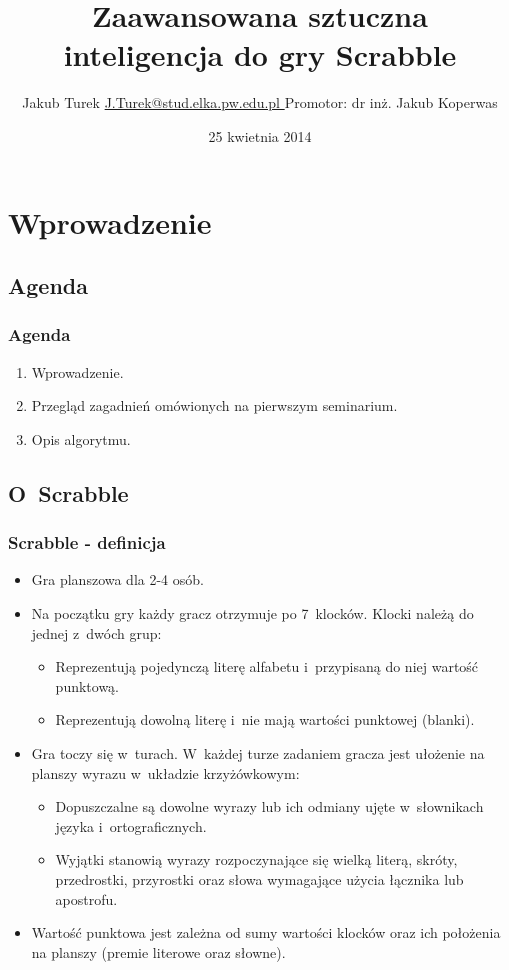 \documentclass[10pt,a4paper]{beamer}
\author[Jakub Turek]{\texorpdfstring{Jakub Turek \newline \href{mailto:J.Turek@stud.elka.pw.edu.pl}{ J.Turek@stud.elka.pw.edu.pl }}{Jakub Turek} \newline \vskip2pt {\small Promotor: dr inż. Jakub Koperwas}}
\title{Zaawansowana sztuczna inteligencja do gry Scrabble}
\institute{Wydział Elektroniki i~Technik Informacyjnych}
\date{25 kwietnia 2014}
\begin{document}
\begin{frame}
	\titlepage
\end{frame}

\section{Wprowadzenie}
\subsection{Agenda}

\begin{frame}
	\frametitle{Agenda}

	\begin{enumerate}
		\item Wprowadzenie.
		\item Przegląd zagadnień omówionych na pierwszym seminarium.
		\item Opis algorytmu.
	\end{enumerate}
\end{frame}

\subsection{O~Scrabble}

\begin{frame}
	\frametitle{Scrabble - definicja}

	\begin{itemize}
		\item Gra planszowa dla 2-4 osób.
		\item Na początku gry każdy gracz otrzymuje po 7~klocków. Klocki należą do jednej z~dwóch grup:
			\begin{itemize}
				\item Reprezentują pojedynczą literę alfabetu i~przypisaną do niej wartość punktową.
				\item Reprezentują dowolną literę i~nie mają wartości punktowej (blanki).
			\end{itemize}
		\item Gra toczy się w~turach. W~każdej turze zadaniem gracza jest ułożenie na planszy wyrazu w~układzie krzyżówkowym:
			\begin{itemize}
				\item Dopuszczalne są dowolne wyrazy lub ich odmiany ujęte w~słownikach języka i~ortograficznych.
				\item Wyjątki stanowią wyrazy rozpoczynające się wielką literą, skróty, przedrostki, przyrostki oraz słowa wymagające użycia łącznika lub apostrofu. 
			\end{itemize}
		\item Wartość punktowa jest zależna od sumy wartości klocków oraz ich położenia na planszy (premie literowe oraz słowne).
	\end{itemize}
\end{frame}
\end{document}
